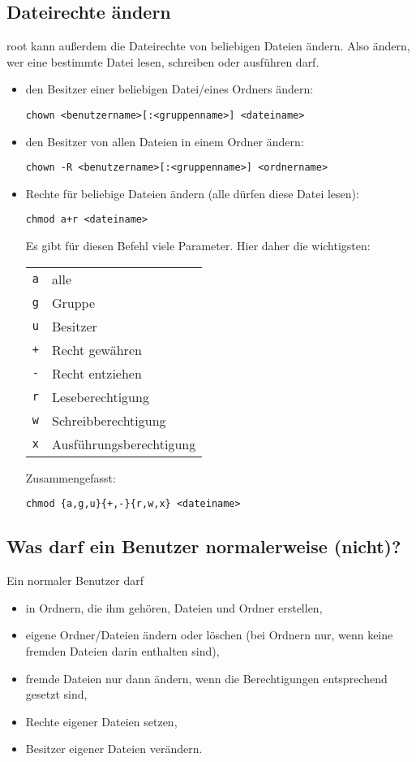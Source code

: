 \documentclass[a4paper,10pt]{article}
\begin{document}
\subsection{Dateirechte ändern}
root kann außerdem die Dateirechte von beliebigen Dateien ändern. Also ändern, 
wer eine bestimmte Datei lesen, schreiben oder ausführen darf.  
\begin{itemize}
\item den Besitzer einer beliebigen Datei/eines Ordners ändern:
\begin{lstlisting}
chown <benutzername>[:<gruppenname>] <dateiname>
\end{lstlisting} 
\item den Besitzer von allen Dateien in einem Ordner ändern:
\begin{lstlisting}
chown -R <benutzername>[:<gruppenname>] <ordnername>
\end{lstlisting} 
\item Rechte für beliebige Dateien ändern (alle dürfen diese Datei lesen):
\begin{lstlisting}
chmod a+r <dateiname>
\end{lstlisting} 
Es gibt für diesen Befehl viele Parameter. Hier daher die wichtigsten:
\begin{center}
\begin{tabular}{ll}
\texttt{a} & alle \\
\texttt{g} & Gruppe \\
\texttt{u} & Besitzer \\
\texttt{+} & Recht gewähren \\
\texttt{-} & Recht entziehen \\
\texttt{r} & Leseberechtigung \\
\texttt{w} & Schreibberechtigung \\
\texttt{x} & Ausführungsberechtigung \\
\end{tabular}
\end{center} 
Zusammengefasst:
\begin{lstlisting}
chmod {a,g,u}{+,-}{r,w,x} <dateiname>
\end{lstlisting} 

\end{itemize}   

\subsection{Was darf ein Benutzer normalerweise (nicht)?}
Ein normaler Benutzer darf 
\begin{itemize}
\item in Ordnern, die ihm gehören, Dateien und Ordner erstellen,
\item eigene Ordner/Dateien ändern oder löschen (bei Ordnern nur, wenn 
keine fremden Dateien darin enthalten sind),
\item fremde Dateien nur dann ändern, wenn die Berechtigungen entsprechend gesetzt sind,
\item Rechte eigener Dateien setzen,
\item Besitzer eigener Dateien verändern.
\end{itemize}
\end{document}

